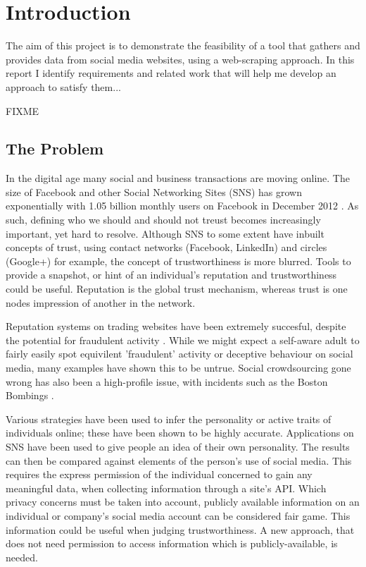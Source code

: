 \chapter{Introduction}\label{C:us}

The aim of this project is to demonstrate the feasibility of a tool that gathers and provides data from social media websites, using a web-scraping approach. In this report I identify requirements and related work that will help me develop an approach to satisfy them... 

FIXME

\section{The Problem}
In the digital age many social and business transactions are moving online. The size of Facebook and other Social Networking Sites (SNS) has grown exponentially with 1.05 billion monthly users on Facebook in December 2012 \cite{fb_users}. As such, defining who we should and should not treust becomes increasingly important, yet hard to resolve. Although SNS to some extent have inbuilt concepts of trust, using contact networks (Facebook, LinkedIn) and circles (Google+) for example, the concept of trustworthiness is more blurred. Tools to provide a snapshot, or hint of an individual's reputation and trustworthiness could be useful. Reputation is the global trust mechanism, whereas trust is one nodes impression of another in the network.

Reputation systems on trading websites have been extremely succesful, despite the potential for fraudulent activity \cite{}. While we might expect a self-aware adult to fairly easily spot equivilent 'fraudulent' activity or deceptive behaviour on social media, many examples have shown this to be untrue. Social crowdsourcing gone wrong has also been a high-profile issue, with incidents such as the Boston Bombings \cite{}.

Various strategies have been used to infer the personality or active traits of individuals online; these have been shown to be highly accurate. Applications on SNS have been used to give people an idea of their own personality. The results can then be compared against elements of the person's use of social media. This requires the express permission of the individual concerned to gain any meaningful data, when collecting information through a site's API. Which privacy concerns must be taken into account, publicly available information on an individual or company's social media account can be considered fair game. This information could be useful when judging trustworthiness. A new approach, that does not need permission to access information which is publicly-available, is needed. 

